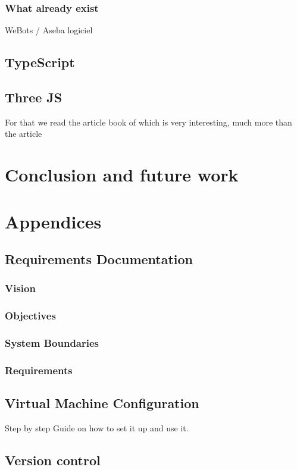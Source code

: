\documentclass{scrartcl}
\begin{document}
\subsubsection{What already exist} 
WeBots / Aseba logiciel
\subsection{TypeScript}
\subsection{Three JS}

For that we read the article book of \cite{Jerald:2015:VBH:2792790}
which is very interesting, much more than the article
\cite{Diniz:2017:UGO:3100317.3100324}

\section{Conclusion and future work}

\section{Appendices}
\subsection{Requirements Documentation}
\subsubsection{Vision}
\subsubsection{Objectives}
\subsubsection{System Boundaries}
\subsubsection{Requirements}

\subsection{Virtual Machine Configuration}
Step by step Guide on how to set it up and use it.

\subsection{Version control}
\end{document}
